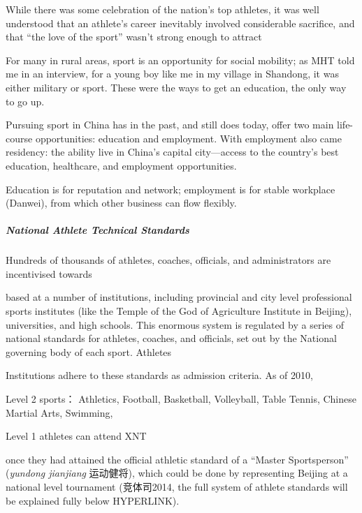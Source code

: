 \begin{CJK}{UTF8}{gbsn}
While there was some celebration of the nation's top athletes, it was well understood that an athlete's career inevitably involved considerable sacrifice, and that ``the love of the sport'' wasn't strong enough to attract

For many in rural areas, sport is an opportunity for social mobility; as MHT told me in an interview, for a young boy like me in my village in Shandong, it was either military or sport.  These were the ways to get an education, the only way to go up.

Pursuing sport in China has in the past, and still does today, offer two main life-course opportunities: education and employment.  With employment also came residency: the ability live in China's capital city---access to the country's best education, healthcare, and employment opportunities.

Education is for reputation and network; employment is for stable workplace (Danwei), from which other business can flow flexibly.












\subparagraph{National Athlete Technical Standards}

Hundreds of thousands of athletes, coaches, officials, and administrators are incentivised towards

 based at a number of institutions, including provincial and city level professional sports institutes (like the Temple of the God of Agriculture Institute in Beijing), universities, and high schools.  This enormous system is regulated by a series of national standards for athletes, coaches, and officials, set out by the National governing body of each sport.  Athletes



 Institutions adhere to these standards as admission criteria.  As of 2010,



Level 2 sports：
Athletics, Football, Basketball, Volleyball, Table Tennis, Chinese Martial Arts, Swimming,

Level 1 athletes can attend XNT

once they had attained the official athletic standard of a ``Master Sportsperson'' (\textit{yundong jianjiang} 运动健将), which could be done by representing Beijing at a national level tournament (竞体司2014, the full system of athlete standards will be explained fully below HYPERLINK).







\end{CJK}
